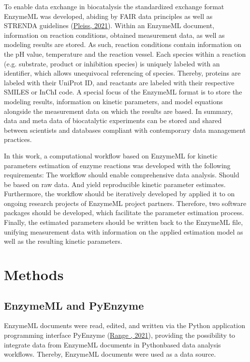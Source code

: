 \documentclass[letterpaper,12pt,english]{jupyterBook}
\begin{document}
\sphinxAtStartPar
To enable data exchange in biocatalysis the standardized exchange format EnzymeML was developed, abiding by FAIR data principles as well as STRENDA guidelines (\hyperlink{cite.references:id4}{Pleiss, 2021}). Within an EnzymeML document, information on reaction conditions, obtained measurement data, as well as modeling results are stored. As such, reaction conditions contain information on the pH value, temperature and the reaction vessel. Each species within a reaction (e.g. substrate, product or inhibition species) is uniquely labeled with an identifier, which allows unequivocal referencing of species. Thereby, proteins are labeled with their UniProt ID, and reactants are labeled with their respective SMILES or InChI code. A special focus of the EnzymeML format is to store the modeling results, information on kinetic parameters, and model equations alongside the measurement data on which the results are based. In summary, data and meta data of biocatalytic experiments can be stored and shared between scientists and databases compliant with contemporary data management practices.

\sphinxAtStartPar
In this work, a computational workflow based on EnzymeML for kinetic parameters estimation of enzyme reactions was developed with the following requirements: The workflow should enable comprehensive data analysis. Should be based on raw data. And yield reproducible kinetic parameter estimates. Furthermore, the workflow should be iteratively developed by applied it to on ongoing research projects of EnzymeML project partners. Therefore, two software packages should be developed, which facilitate the parameter estimation process. Finally, the estimated parameters should be written back to the EnzymeML file, unifying measurement data with information on the applied estimation model as well as the resulting kinetic parameters.

\sphinxstepscope


\chapter{Methods}
\label{\detokenize{methods:methods}}\label{\detokenize{methods::doc}}

\section{EnzymeML and PyEnzyme}
\label{\detokenize{methods:enzymeml-and-pyenzyme}}
\sphinxAtStartPar
EnzymeML documents were read, edited, and written via the Python application programming interface PyEnzyme (\hyperlink{cite.references:id12}{Range , 2021}), providing the possibility to integrate data from EnzymeML documents in Python\sphinxhyphen{}based data analysis workflows. Thereby, EnzymeML documents were used as a data source.
\end{document}
